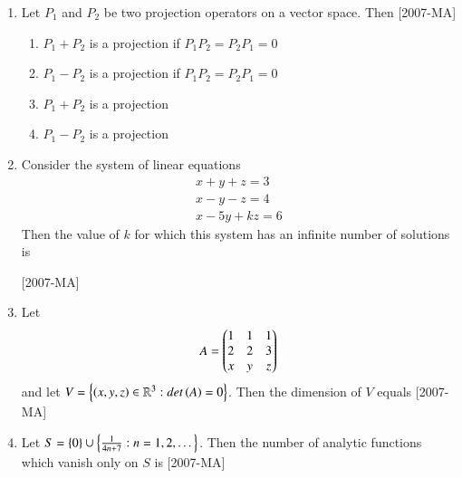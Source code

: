 \documentclass[journal]{IEEEtran}
\begin{document}
\begin{enumerate}
\item Let $P_1$ and $P_2$ be two projection operators on a vector space. Then \hfill{[2007-MA]}
\begin{enumerate}
    \item $P_1+P_2$ is a projection if $P_1 P_2=P_2 P_1=0$
    \item $P_1-P_2$ is a projection if $P_1 P_2=P_2 P_1=0$
    \item $P_1+P_2$ is a projection 
    \item $P_1-P_2$ is a projection 
\end{enumerate}

\item Consider the system of linear equations 
\begin{align*}
    x+y+z=3\\
    x-y-z=4\\
    x-5y+kz=6
\end{align*}
Then the value of $k$ for which this system has an infinite number of solutions is 

    \hfill{[2007-MA]}
\begin{enumerate}
\end{enumerate}

\item Let
\begin{align*}
    A=\begin{pmatrix}1&1&1\\2&2&3\\x&y&z\end{pmatrix}
\end{align*}
and let $V=\left\{\left(x,y,z\right)\in \mathbb R^3: det\left(A\right)=0\right\}$. Then the dimension of $V$ equals \hfill{[2007-MA]}
\begin{enumerate}
\end{enumerate}

\item Let $S=\left\{0\right\} \cup \left\{\frac{1}{4n+7}: n=1,2,\dots\right\}$. Then the number of analytic functions which vanish only on $S$ is \hfill{[2007-MA]}
\begin{enumerate}
\end{enumerate}


\end{enumerate}
\end{document}
